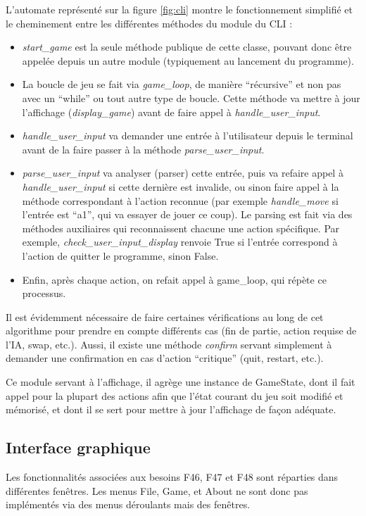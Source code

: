 \documentclass[12pt]{article}
\begin{document}
L'automate représenté sur la figure \ref{fig:cli} montre le fonctionnement simplifié et le cheminement entre les différentes méthodes du module du CLI :
\begin{itemize}
    \item \textit{start\_game} est la seule méthode publique de cette classe, pouvant donc être appelée depuis un autre module (typiquement au lancement du programme).
    \item La boucle de jeu se fait via \textit{game\_loop},  de manière “récursive” et non pas avec un “while” ou tout autre type de boucle. Cette méthode va mettre à jour l’affichage (\textit{display\_game}) avant de faire appel à \textit{handle\_user\_input}.
    \item \textit{handle\_user\_input} va demander une entrée à l’utilisateur depuis le terminal avant de la faire passer à la méthode \textit{parse\_user\_input}.
    \item \textit{parse\_user\_input} va analyser (parser) cette entrée, puis va refaire appel à \textit{handle\_user\_input} si cette dernière est invalide, ou sinon faire appel à la méthode correspondant à l’action reconnue (par exemple \textit{handle\_move} si l’entrée est “a1”, qui va essayer de jouer ce coup). Le parsing est fait via des méthodes auxiliaires qui reconnaissent chacune une action spécifique. Par exemple, \textit{check\_user\_input\_display} renvoie True si l’entrée correspond à l’action de quitter le programme, sinon False.
    \item Enfin, après chaque action, on refait appel à game\_loop, qui répète ce processus.
\end{itemize}
Il est évidemment nécessaire de faire certaines vérifications au long de cet algorithme pour prendre en compte différents cas (fin de partie, action requise de l’IA, swap, etc.). Aussi, il existe une méthode \textit{confirm} servant simplement à demander une confirmation en cas d'action “critique” (quit, restart, etc.).

\bigskip
Ce module servant à l’affichage, il agrège une instance de GameState, dont il fait appel pour la plupart des actions afin que l’état courant du jeu soit modifié et mémorisé, et dont il se sert pour mettre à jour l’affichage de façon adéquate.

\subsection{Interface graphique}

Les fonctionnalités associées aux besoins F46, F47 et F48 sont réparties dans différentes fenêtres. Les menus File, Game, et About ne sont donc pas implémentés via des menus déroulants mais des fenêtres.
\end{document}
